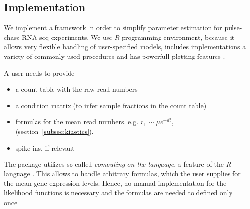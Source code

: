 \subsection{Implementation}
We implement a framework in order  to simplify parameter estimation for 
pulse-chase RNA-seq experiments. 
We use \emph{R} programming environment, 
because it allows very flexible handling of user-specified models, 
includes implementations a variety of commonly used procedures and 
has powerfull plotting features \citep{rlang}.
\par A user needs to provide
\begin{itemize}
 \item a count table with the raw read numbers
 \item a condition matrix (to infer sample fractions in the count table)
 \item formulas for the mean read numbers, e.g. 
 $r_\text{L}\sim \mu e^{-dt}$, (section~\ref{subsec:kinetics}).
 \item spike-ins, if relevant
\end{itemize}
The package utilizes so-called \emph{computing on the language},
a feature of the \emph{R} language \citep{team2000r}.
This allows to handle arbitrary formulas, which the user supplies for 
the mean gene expression levels. Hence, no manual 
implementation for the likelihood functions is necessary and the 
formulas are needed to defined only once.
